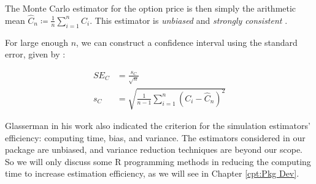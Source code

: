 The Monte Carlo estimator for the option price is then simply the arithmetic mean $\hat{C}_n\coloneqq\frac{1}{n}\sum_{i=1}^{n}{C_i}$. This estimator is \textit{unbiased} and \textit{strongly consistent} \cite{Glasserman2003}.

For large enough $n$, we can construct a confidence interval using the standard error, given by \cite{Glasserman2003}:

\begin{align} \label{eq:mc_SE}
SE_C &= \frac{s_C}{\sqrt{n}} \\
 s_C &= \sqrt{\frac{1}{n-1}\sum_{i=1}^{n}{(C_i-\hat{C}_n)^2}}
\end{align}

Glasserman in his work \cite{Glasserman2003} also indicated the criterion for the simulation estimators' efficiency: computing time, bias, and variance. The estimators considered in our package are unbiased, and variance reduction techniques are beyond our scope. So we will only discuss some R programming methods in reducing the computing time to increase estimation efficiency, as we will see in Chapter \ref{cpt:Pkg Dev}.

\newpage